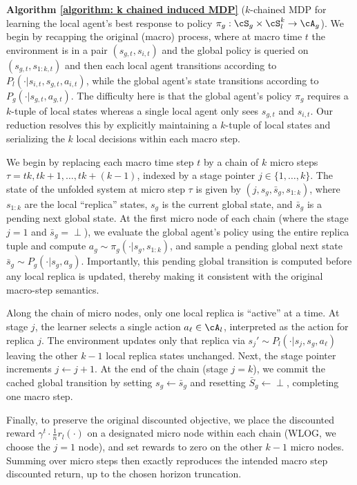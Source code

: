 \documentclass{article}
\theoremstyle{plain}
\theoremstyle{definition}
\begin{document}
\textbf{Algorithm \ref{algorithm: k chained induced MDP}} ($k$-chained MDP for learning the local agent's best response to policy $\pi_g:\cS_g\times\cS_l^k\to\cA_g$). We begin by recapping the original (macro) process, where at macro time $t$ the environment is in a pair $(s_{g,t}, s_{i,t})$ and the global policy is queried on $(s_{g,t}, s_{1:k, t})$ and then each local agent transitions according to $P_l(\cdot|s_{i,t}, s_{g,t}, a_{i,t})$, while the global agent's state transitions according to $P_g(\cdot|s_{g,t}, a_{g,t})$. The difficulty here is that the global agent's policy $\pi_g$ requires a $k$-tuple of local states whereas a single local agent only sees $s_{g,t}$ and $s_{i,t}$. Our reduction resolves this by explicitly maintaining a $k$-tuple of local states and serializing the $k$ local decisions within each macro step.

We begin by replacing each macro time step $t$ by a chain of $k$ micro steps $\tau = tk, tk+1, \dots, tk+(k-1)$, indexed by a stage pointer $j\in\{1,\dots,k\}$. The state of the unfolded system at micro step $\tau$ is given by $(j, s_g, \bar{s}_g, s_{1:k})$, where $s_{1:k}$ are the local ``replica'' states, $s_g$ is the current global state, and $\bar{s}_g$ is a pending next global state. At the first micro node of each chain (where the stage $j=1$ and $\bar{s}_g = \perp$), we evaluate the global agent's policy using the entire replica tuple and compute $a_g\sim \pi_g(\cdot|s_g, s_{1:k})$, and sample a pending global next state $\bar{s}_g\sim P_g(\cdot|s_g, a_g)$.  Importantly, this pending global transition is computed before any local replica is updated, thereby making it consistent with the original macro-step semantics. 

Along the chain of micro nodes, only one local replica is ``active'' at a time. At stage $j$, the learner selects a single action $a_\ell\in\cA_l$, interpreted as the action for replica $j$. The environment updates only that replica via $s_j' \sim P_l(\cdot|s_j, s_g, a_\ell)$ leaving the other $k-1$ local replica states unchanged. Next, the stage pointer increments $j\gets j+1$. At the end of the chain (stage $j=k$), we commit the cached global transition by setting $s_g\gets \bar{s}_g$ and resetting $\bar{S}_g \gets \perp$, completing one macro step. 

Finally, to preserve the original discounted objective, we place the discounted reward $\gamma^t\cdot \frac{1}{n} r_l(\cdot)$ on a designated micro node within each chain (WLOG, we choose the $j=1$ node), and set rewards to zero on the other $k-1$ micro nodes. Summing over micro steps then exactly reproduces the intended macro step discounted return, up to the chosen horizon truncation.
\end{document}
